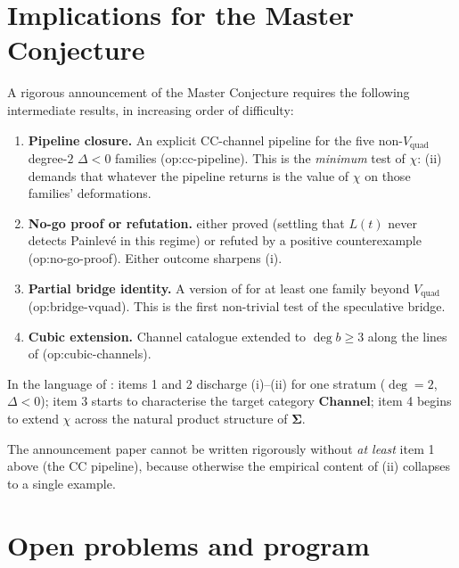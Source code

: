 \documentclass[11pt,reqno]{amsart}
\theoremstyle{plain}
\theoremstyle{definition}
\theoremstyle{remark}
\newcommand{\Channel}{\mathbf{Channel}}
\newcommand{\Sigmaspace}{\mathbf{\Sigma}}
\newcommand{\Lt}{L(t)}
\newcommand{\CC}{\mathrm{CC}}
\newcommand{\Vquad}{V_{\mathrm{quad}}}
\begin{document}
\section{Implications for the Master Conjecture}
\label{sec:implications}

A rigorous announcement of the Master Conjecture
\cite{siarc_umbrella} requires the following intermediate
results, in increasing order of difficulty:

\begin{enumerate}
\item \textbf{Pipeline closure.} An explicit $\CC$-channel
pipeline for the five non-$\Vquad$ degree-$2$ $\Delta<0$
families (\textsf{op:cc-pipeline}). This is the
\emph{minimum} test of $\chi$: (ii) demands
that whatever the pipeline returns is the value of $\chi$ on
those families' deformations.
\item \textbf{No-go proof or refutation.} 
either proved (settling that $\Lt$ never detects Painlev\'e
in this regime) or refuted by a positive counterexample
(\textsf{op:no-go-proof}). Either outcome sharpens
(i).
\item \textbf{Partial bridge identity.} A version of
 for at least one family beyond $\Vquad$
(\textsf{op:bridge-vquad}). This is the first non-trivial
test of the speculative bridge.
\item \textbf{Cubic extension.} Channel catalogue extended to
$\deg b \ge 3$ along the lines of \cite{siarc_pcf2_program}
(\textsf{op:cubic-channels}).
\end{enumerate}

In the language of : items 1 and 2
discharge (i)--(ii) for one stratum
($\deg = 2$, $\Delta < 0$); item 3 starts to characterise the
target category $\Channel$; item 4 begins to extend $\chi$
across the natural product structure of $\Sigmaspace$.

\medskip
The announcement paper cannot be written rigorously without
\emph{at least} item 1 above (the $\CC$ pipeline), because
otherwise the empirical content of (ii)
collapses to a single example.

\section{Open problems and program}
\label{sec:open}
\end{document}
